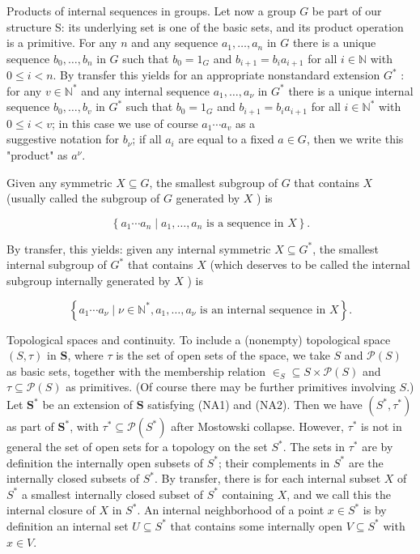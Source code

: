 \documentclass[10pt]{article}
\begin{document}
Products of internal sequences in groups. Let now a group $G$ be part of our structure S: its underlying set is one of the basic sets, and its product operation is a primitive. For any $n$ and any sequence $a_{1}, \ldots, a_{n}$ in $G$ there is a unique sequence $b_{0}, \ldots, b_{n}$ in $G$ such that $b_{0}=1_{G}$ and $b_{i+1}=b_{i} a_{i+1}$ for all $i \in \mathbb{N}$ with $0 \leq i<n$. By transfer this yields for an appropriate nonstandard extension $G^{*}$ : for any $v \in \mathbb{N}^{*}$ and any internal sequence $a_{1}, \ldots, a_{\nu}$ in $G^{*}$ there is a unique internal sequence $b_{0}, \ldots, b_{v}$ in $G^{*}$ such that $b_{0}=1_{G}$ and $b_{i+1}=b_{i} a_{i+1}$ for all $i \in \mathbb{N}^{*}$ with $0 \leq i<v$; in this case we use of course $a_{1} \cdots a_{v}$ as a\\
suggestive notation for $b_{\nu}$; if all $a_{i}$ are equal to a fixed $a \in G$, then we write this "product" as $a^{\nu}$.

Given any symmetric $X \subseteq G$, the smallest subgroup of $G$ that contains $X$ (usually called the subgroup of $G$ generated by $X$ ) is

$$
\left\{a_{1} \cdots a_{n} \mid a_{1}, \ldots, a_{n} \text { is a sequence in } X\right\} .
$$

By transfer, this yields: given any internal symmetric $X \subseteq G^{*}$, the smallest internal subgroup of $G^{*}$ that contains $X$ (which deserves to be called the internal subgroup internally generated by $X$ ) is

$$
\left\{a_{1} \cdots a_{\nu} \mid \nu \in \mathbb{N}^{*}, a_{1}, \ldots, a_{\nu} \text { is an internal sequence in } X\right\} .
$$

Topological spaces and continuity. To include a (nonempty) topological space $(S, \tau)$ in $\mathbf{S}$, where $\tau$ is the set of open sets of the space, we take $S$ and $\mathcal{P}(S)$ as basic sets, together with the membership relation $\in_{S} \subseteq S \times \mathcal{P}(S)$ and $\tau \subseteq \mathcal{P}(S)$ as primitives. (Of course there may be further primitives involving $S$.) Let $\mathbf{S}^{*}$ be an extension of $\mathbf{S}$ satisfying (NA1) and (NA2). Then we have $\left(S^{*}, \tau^{*}\right)$ as part of $\mathbf{S}^{*}$, with $\tau^{*} \subseteq \mathcal{P}\left(S^{*}\right)$ after Mostowski collapse. However, $\tau^{*}$ is not in general the set of open sets for a topology on the set $S^{*}$. The sets in $\tau^{*}$ are by definition the internally open subsets of $S^{*}$; their complements in $S^{*}$ are the internally closed subsets of $S^{*}$. By transfer, there is for each internal subset $X$ of $S^{*}$ a smallest internally closed subset of $S^{*}$ containing $X$, and we call this the internal closure of $X$ in $S^{*}$. An internal neighborhood of a point $x \in S^{*}$ is by definition an internal set $U \subseteq S^{*}$ that contains some internally open $V \subseteq S^{*}$ with $x \in V$.
\end{document}
